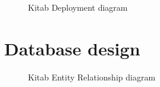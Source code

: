 		\begin{figure}[H]
		\begin{center}

		\caption{Kitab Deployment diagram}
		\label{dia_mvc_dplymnt}

		\end{center}
		\end{figure}

\section{Database design}

	\begin{figure}[H]
	\begin{center}

	\caption{Kitab Entity Relationship diagram}
	\label{dia_er}

	\end{center}
	\end{figure}


